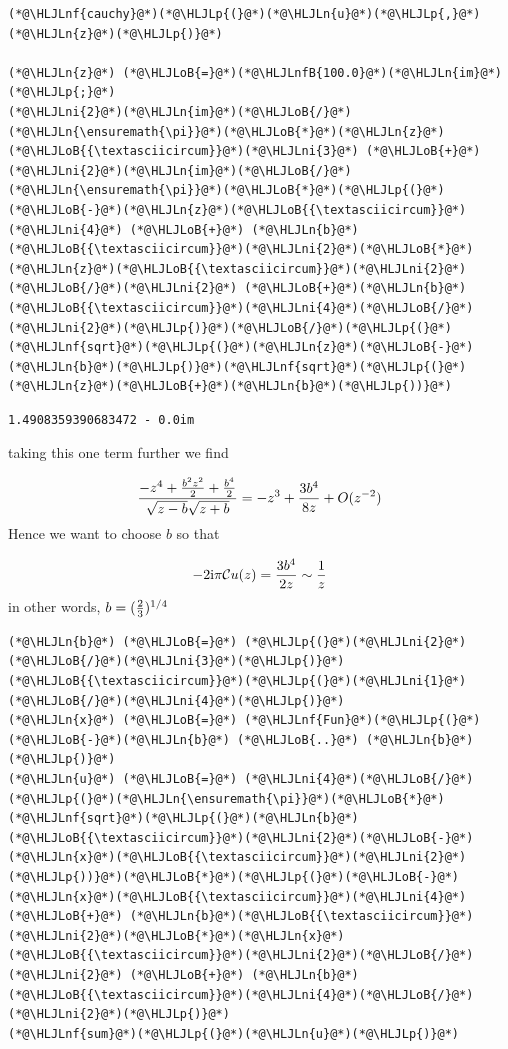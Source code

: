\documentclass[12pt,a4paper]{article}
\newcommand{\HLJLn}[1]{#1}
\newcommand{\HLJLnf}[1]{\textcolor[RGB]{66,102,213}{#1}}
\newcommand{\HLJLnfB}[1]{\textcolor[RGB]{59,151,46}{#1}}
\newcommand{\HLJLni}[1]{\textcolor[RGB]{59,151,46}{#1}}
\newcommand{\HLJLoB}[1]{\textcolor[RGB]{102,102,102}{\textbf{#1}}}
\newcommand{\HLJLp}[1]{#1}
\def\I{ {\rm i} }
\def\CC{ {\cal C} }
\begin{document}
\begin{lstlisting}
(*@\HLJLnf{cauchy}@*)(*@\HLJLp{(}@*)(*@\HLJLn{u}@*)(*@\HLJLp{,}@*) (*@\HLJLn{z}@*)(*@\HLJLp{)}@*)

(*@\HLJLn{z}@*) (*@\HLJLoB{=}@*)(*@\HLJLnfB{100.0}@*)(*@\HLJLn{im}@*)(*@\HLJLp{;}@*)
(*@\HLJLni{2}@*)(*@\HLJLn{im}@*)(*@\HLJLoB{/}@*)(*@\HLJLn{\ensuremath{\pi}}@*)(*@\HLJLoB{*}@*)(*@\HLJLn{z}@*)(*@\HLJLoB{{\textasciicircum}}@*)(*@\HLJLni{3}@*) (*@\HLJLoB{+}@*) (*@\HLJLni{2}@*)(*@\HLJLn{im}@*)(*@\HLJLoB{/}@*)(*@\HLJLn{\ensuremath{\pi}}@*)(*@\HLJLoB{*}@*)(*@\HLJLp{(}@*)(*@\HLJLoB{-}@*)(*@\HLJLn{z}@*)(*@\HLJLoB{{\textasciicircum}}@*)(*@\HLJLni{4}@*) (*@\HLJLoB{+}@*) (*@\HLJLn{b}@*)(*@\HLJLoB{{\textasciicircum}}@*)(*@\HLJLni{2}@*)(*@\HLJLoB{*}@*)(*@\HLJLn{z}@*)(*@\HLJLoB{{\textasciicircum}}@*)(*@\HLJLni{2}@*)(*@\HLJLoB{/}@*)(*@\HLJLni{2}@*) (*@\HLJLoB{+}@*)(*@\HLJLn{b}@*)(*@\HLJLoB{{\textasciicircum}}@*)(*@\HLJLni{4}@*)(*@\HLJLoB{/}@*)(*@\HLJLni{2}@*)(*@\HLJLp{)}@*)(*@\HLJLoB{/}@*)(*@\HLJLp{(}@*)(*@\HLJLnf{sqrt}@*)(*@\HLJLp{(}@*)(*@\HLJLn{z}@*)(*@\HLJLoB{-}@*)(*@\HLJLn{b}@*)(*@\HLJLp{)}@*)(*@\HLJLnf{sqrt}@*)(*@\HLJLp{(}@*)(*@\HLJLn{z}@*)(*@\HLJLoB{+}@*)(*@\HLJLn{b}@*)(*@\HLJLp{))}@*)
\end{lstlisting}

\begin{lstlisting}
1.4908359390683472 - 0.0im
\end{lstlisting}


taking this one term further we find  

\[
 {-z^4 +  {b^2z^2 \over 2} + {b^4 \over 2} \over \sqrt{z-b}\sqrt{z+b}} = -z^3 +{3 b^4 \over 8 z} + O(z^{-2})
\]
Hence we want to choose $b$ so that

\[
-2\I\pi \CC u(z) = {3 b^4 \over 2 z} \sim {1 \over z}
\]
in other words, $b = ({2 \over 3})^{1/4}$


\begin{lstlisting}
(*@\HLJLn{b}@*) (*@\HLJLoB{=}@*) (*@\HLJLp{(}@*)(*@\HLJLni{2}@*)(*@\HLJLoB{/}@*)(*@\HLJLni{3}@*)(*@\HLJLp{)}@*)(*@\HLJLoB{{\textasciicircum}}@*)(*@\HLJLp{(}@*)(*@\HLJLni{1}@*)(*@\HLJLoB{/}@*)(*@\HLJLni{4}@*)(*@\HLJLp{)}@*)
(*@\HLJLn{x}@*) (*@\HLJLoB{=}@*) (*@\HLJLnf{Fun}@*)(*@\HLJLp{(}@*)(*@\HLJLoB{-}@*)(*@\HLJLn{b}@*) (*@\HLJLoB{..}@*) (*@\HLJLn{b}@*)(*@\HLJLp{)}@*)
(*@\HLJLn{u}@*) (*@\HLJLoB{=}@*) (*@\HLJLni{4}@*)(*@\HLJLoB{/}@*)(*@\HLJLp{(}@*)(*@\HLJLn{\ensuremath{\pi}}@*)(*@\HLJLoB{*}@*)(*@\HLJLnf{sqrt}@*)(*@\HLJLp{(}@*)(*@\HLJLn{b}@*)(*@\HLJLoB{{\textasciicircum}}@*)(*@\HLJLni{2}@*)(*@\HLJLoB{-}@*)(*@\HLJLn{x}@*)(*@\HLJLoB{{\textasciicircum}}@*)(*@\HLJLni{2}@*)(*@\HLJLp{))}@*)(*@\HLJLoB{*}@*)(*@\HLJLp{(}@*)(*@\HLJLoB{-}@*)(*@\HLJLn{x}@*)(*@\HLJLoB{{\textasciicircum}}@*)(*@\HLJLni{4}@*) (*@\HLJLoB{+}@*) (*@\HLJLn{b}@*)(*@\HLJLoB{{\textasciicircum}}@*)(*@\HLJLni{2}@*)(*@\HLJLoB{*}@*)(*@\HLJLn{x}@*)(*@\HLJLoB{{\textasciicircum}}@*)(*@\HLJLni{2}@*)(*@\HLJLoB{/}@*)(*@\HLJLni{2}@*) (*@\HLJLoB{+}@*) (*@\HLJLn{b}@*)(*@\HLJLoB{{\textasciicircum}}@*)(*@\HLJLni{4}@*)(*@\HLJLoB{/}@*)(*@\HLJLni{2}@*)(*@\HLJLp{)}@*)
(*@\HLJLnf{sum}@*)(*@\HLJLp{(}@*)(*@\HLJLn{u}@*)(*@\HLJLp{)}@*)
\end{lstlisting}
\end{document}
